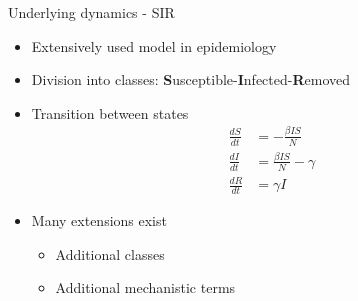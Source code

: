 \documentclass[11pt,compress,aspectratio=1610]{beamer}
\begin{document}
\begin{frame}{Underlying dynamics - SIR}
\begin{itemize}
    \item Extensively used model in epidemiology
    \item Division into classes: {\bf S}usceptible-{\bf I}nfected-{\bf R}emoved
    \item Transition between states
        \begin{equation*}
            \begin{array}{rl}
                \frac{dS}{dt} & = - \frac{\beta I S}{N} \\
                \frac{dI}{dt} & = \frac{\beta I S}{N} - \gamma  \\
                \frac{dR}{dt} & = \gamma I
            \end{array}
        \end{equation*}
    \item Many extensions exist
    \begin{itemize}
        \item Additional classes
        \item Additional mechanistic terms
    \end{itemize}
\end{itemize}
\end{frame}
\end{document}
